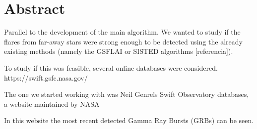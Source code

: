\documentclass[12pt]{article}
\begin{document}
	
\section{Abstract}

Parallel to the development of the main algorithm. We wanted to study if the flares from far-away stars were strong enough to be detected using the already existing methods (namely the GSFLAI or SISTED algorithms [referencia]).

To study if this was feasible, several online databases were considered. 
https://swift.gsfc.nasa.gov/

The one we started working with was Neil Genrels Swift Observatory databases, a website maintained by NASA

In this website the most recent detected Gamma Ray Bursts (GRBs) can be seen. 
\end{document}
